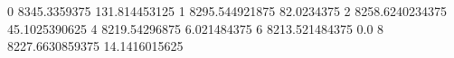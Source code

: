 0 8345.3359375 131.814453125
1 8295.544921875 82.0234375
2 8258.6240234375 45.1025390625
4 8219.54296875 6.021484375
6 8213.521484375 0.0
8 8227.6630859375 14.1416015625
